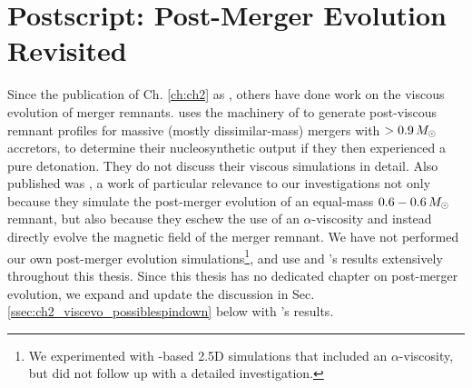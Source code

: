 \section{Postscript: Post-Merger Evolution Revisited}
\label{sec:c2_postscript}

Since the publication of Ch. \ref{ch:ch2} as \cite{zhu+13}, others have done work on the viscous evolution of merger remnants.  \cite{rask+14} uses the machinery of \cite{schw+12} to generate post-viscous remnant profiles for massive (mostly dissimilar-mass) mergers with $>0.9\,\Msun$ accretors, to determine their nucleosynthetic output if they then experienced a pure detonation.  They do not discuss their viscous simulations in detail.  Also published was \cite{ji+13}, a work of particular relevance to our investigations not only because they simulate the post-merger evolution of an equal-mass $0.6-0.6\,\Msun$ remnant, but also because they eschew the use of an $\alpha$-viscosity and instead directly evolve the magnetic field of the merger remnant.  We have not performed our own post-merger evolution simulations\footnote{We experimented with \flash-based 2.5D simulations that included an $\alpha$-viscosity, but did not follow up with a detailed investigation.}, and use \cite{schw+12} and \cite{ji+13}'s results extensively throughout this thesis.  Since this thesis has no dedicated chapter on post-merger evolution, we expand and update the discussion in Sec. \ref{ssec:ch2_viscevo_possiblespindown} below with \cite{ji+13}'s results.


